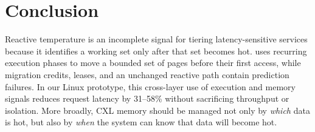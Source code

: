 \section{Conclusion}
\label{sec:conclusion}

Reactive temperature is an incomplete signal for tiering latency-sensitive
services because it identifies a working set only after that set becomes hot.
\system uses recurring execution phases to move a bounded set of pages before
their first access, while migration credits, leases, and an unchanged reactive
path contain prediction failures.  In our Linux prototype, this cross-layer
use of execution and memory signals reduces \ptail request latency by 31--58\%
without sacrificing throughput or isolation.  More broadly, CXL memory should
be managed not only by \emph{which} data is hot, but also by \emph{when} the
system can know that data will become hot.
